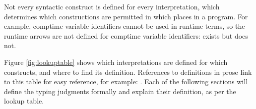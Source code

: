 \documentclass[12pt,twoside]{report}
\begin{document}
Not every syntactic construct is defined for every interpretation, which determines which constructions are permitted in which places in a program. For example, comptime variable identifiers cannot be used in runtime terms, so the runtime arrows are not defined for comptime variable identifiers:  exists but  does not.

Figure \ref{fig:lookuptable} shows which interpretations are defined for which constructs, and where to find its definition. References to definitions in prose link to this table for easy reference, for example: .  Each of the following sections will define the typing judgments formally and explain their definition, as per the lookup table.

\end{document}
